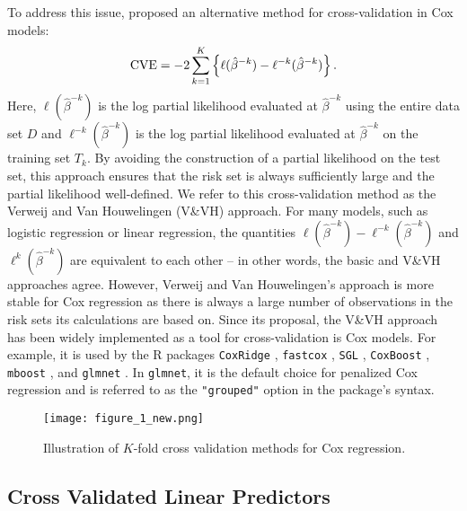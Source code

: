 To address this issue, \citet{Verweij1993} proposed an alternative method for cross-validation in Cox models:
\begin{equation}
\label{eq:VVH}
	\textrm{CVE} = -2\sum_{k = 1}^K \left\{ \ell(\hat{\beta}^{- k})  - \ell^{-k}(\hat{\beta}^{- k}) \right\}. 
\end{equation}
Here, $\ell(\hat{\beta}^{-k})$ is the log partial likelihood evaluated at $\hat{\beta}^{-k}$ using the entire data set $D$ and $\ell^{-k}(\hat{\beta}^{-k})$ is the log partial likelihood evaluated at $\hat{\beta}^{-k}$ on
the training set $T_k$. By avoiding the construction of a partial likelihood on the test set, this approach ensures that the risk set is always sufficiently large and the partial likelihood well-defined.  We refer to this cross-validation method as the Verweij and Van Houwelingen (V\&VH) approach. For many models, such as logistic regression or linear regression, the quantities $\ell(\hat{\beta}^{- k})  - \ell^{-k}(\hat{\beta}^{- k})$ and  $\ell^{k}(\hat{\beta}^{-k})$ are equivalent to each other -- in other words, the basic and V\&VH approaches agree.  However, Verweij and Van Houwelingen's approach is more stable for Cox regression as there is always a large number of observations in the risk sets its calculations are based on.  Since its proposal, the V\&VH approach has been widely implemented as a tool for cross-validation is Cox models.  For example, it is used by the R packages {\tt CoxRidge} \citep{CoxRidge}, {\tt fastcox} \citep{fastcox}, {\tt SGL} \citep{SGL} , {\tt CoxBoost} \citep{CoxBoost}, {\tt mboost} \citep{mboost}, and {\tt glmnet} \citep{glmnet}.  In {\tt glmnet}, it is the default choice for penalized Cox regression and is referred to as the \verb|"grouped"| option in the package's syntax.

\begin{figure}
  \centering
  \texttt{[image: figure\_1\_new.png]}
  \caption{\label{Fig:methods} Illustration of $K$-fold cross validation methods for Cox regression.}
\end{figure}	

\subsection{Cross Validated Linear Predictors}
\label{Sec:linear-predictor}

